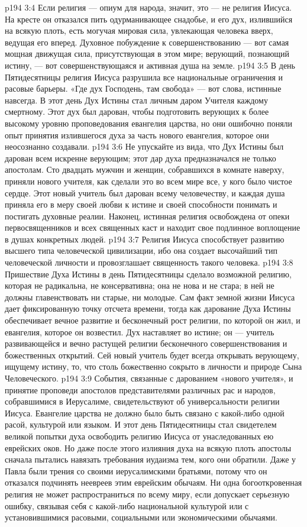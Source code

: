 \vs p194 3:4 Если религия --- опиум для народа, значит, это --- не религия Иисуса. На кресте он отказался пить одурманивающее снадобье, и его дух, излившийся на всякую плоть, есть могучая мировая сила, увлекающая человека вверх, ведущая его вперед. Духовное побуждение к совершенствованию --- вот самая мощная движущая сила, присутствующая в этом мире; верующий, познающий истину, --- вот совершенствующаяся и активная душа на земле.
\vs p194 3:5 В день Пятидесятницы религия Иисуса разрушила все национальные ограничения и расовые барьеры. «Где дух Господень, там свобода» --- вот слова, истинные навсегда. В этот день Дух Истины стал личным даром Учителя каждому смертному. Этот дух был дарован, чтобы подготовить верующих к более высокому уровню проповедования евангелия царства, но они ошибочно поняли опыт принятия излившегося духа за часть нового евангелия, которое они неосознанно создавали.
\vs p194 3:6 \pc Не упускайте из вида, что Дух Истины был дарован всем искренне верующим; этот дар духа предназначался не только апостолам. Сто двадцать мужчин и женщин, собравшихся в комнате наверху, приняли нового учителя, как сделали это во всем мире все, у кого было чистое сердце. Этот новый учитель был дарован всему человечеству, и каждая душа приняла его в меру своей любви к истине и своей способности понимать и постигать духовные реалии. Наконец, истинная религия освобождена от опеки первосвященников и всех священных каст и находит свое подлинное воплощение в душах конкретных людей.
\vs p194 3:7 \pc Религия Иисуса способствует развитию высшего типа человеческой цивилизации, ибо она создает высочайший тип человеческой личности и провозглашает священность такого человека.
\vs p194 3:8 Пришествие Духа Истины в день Пятидесятницы сделало возможной религию, которая не радикальна, не консервативна; она не нова и не стара; в ней не должны главенствовать ни старые, ни молодые. Сам факт земной жизни Иисуса дает фиксированную точку отсчета времени, тогда как дарование Духа Истины обеспечивает вечное развитие и бесконечный рост религии, по которой он жил, и евангелия, которое он возвестил. Дух наставляет во  истине; он --- учитель развивающейся и вечно растущей религии бесконечного совершенствования и божественных открытий. Сей новый учитель будет всегда открывать верующему, ищущему истину, то, что столь божественно сокрыто в личности и природе Сына Человеческого.
\vs p194 3:9 События, связанные с дарованием «нового учителя», и принятие проповеди апостолов представителями различных рас и народов, собравшимися в Иерусалиме, свидетельствуют об универсальности религии Иисуса. Евангелие царства не должно было быть связано с какой\hyp{}либо одной расой, культурой или языком. И этот день Пятидесятницы стал свидетелем великой попытки духа освободить религию Иисуса от унаследованных ею еврейских оков. Но даже после этого излияния духа на всякую плоть апостолы сначала пытались навязать требования иудаизма тем, кого они обратили. Даже у Павла были трения со своими иерусалимскими братьями, потому что он отказался подчинять неевреев этим еврейским обычаям. Ни одна богооткровенная религия не может распространиться по всему миру, если допускает серьезную ошибку, связывая себя с какой\hyp{}либо национальной культурой или с установившимися расовыми, социальными или экономическими обычаями.
